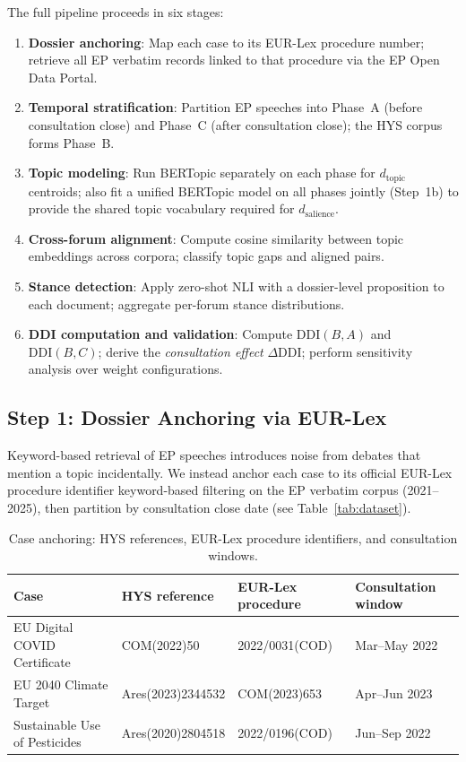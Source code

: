 \documentclass[sigconf,natbib]{acmart}
\begin{document}
The full pipeline proceeds in six stages:

\begin{enumerate}
  \item \textbf{Dossier anchoring}: Map each case to its EUR-Lex procedure number; retrieve
        all EP verbatim records linked to that procedure via the EP Open Data Portal.
  \item \textbf{Temporal stratification}: Partition EP speeches into Phase~A (before
        consultation close) and Phase~C (after consultation close); the HYS corpus forms
        Phase~B.
  \item \textbf{Topic modeling}: Run BERTopic separately on each phase for $d_{\text{topic}}$
        centroids; also fit a unified BERTopic model on all phases jointly (Step~1b) to provide
        the shared topic vocabulary required for $d_{\text{salience}}$.
  \item \textbf{Cross-forum alignment}: Compute cosine similarity between topic embeddings
        across corpora; classify topic gaps and aligned pairs.
  \item \textbf{Stance detection}: Apply zero-shot NLI with a dossier-level proposition
        to each document; aggregate per-forum stance distributions.
  \item \textbf{DDI computation and validation}: Compute $\text{DDI}(B, A)$ and
        $\text{DDI}(B, C)$; derive the \textit{consultation effect} $\Delta\text{DDI}$;
        perform sensitivity analysis over weight configurations.
\end{enumerate}

\subsection{Step 1: Dossier Anchoring via EUR-Lex}

Keyword-based retrieval of EP speeches introduces noise from debates that mention a topic
incidentally. We instead anchor each case to its official EUR-Lex procedure identifier
keyword-based filtering on the EP verbatim corpus (2021--2025), then partition by
consultation close date (see Table~\ref{tab:dataset}).

\begin{table}[h]
\centering
\small
\begin{tabular}{llll}
\toprule
\textbf{Case} & \textbf{HYS reference} & \textbf{EUR-Lex procedure} & \textbf{Consultation window} \\
\midrule
EU Digital COVID Certificate  & COM(2022)50       & 2022/0031(COD) & Mar--May 2022 \\
EU 2040 Climate Target        & Ares(2023)2344532 & COM(2023)653   & Apr--Jun 2023 \\
Sustainable Use of Pesticides & Ares(2020)2804518 & 2022/0196(COD) & Jun--Sep 2022 \\
\bottomrule
\end{tabular}
\caption{Case anchoring: HYS references, EUR-Lex procedure identifiers, and consultation windows.}
\label{tab:cases}
\end{table}
\end{document}
